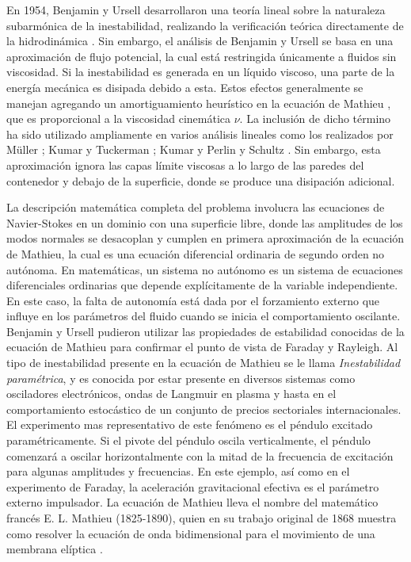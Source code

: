 En 1954, Benjamin y Ursell desarrollaron una teoría lineal sobre la naturaleza subarmónica de la inestabilidad, realizando la verificación teórica directamente de la hidrodinámica \cite{Benjamin1954}. Sin embargo, el análisis de Benjamin y Ursell se basa en una aproximación de flujo potencial, la cual está restringida únicamente a fluidos sin viscosidad. Si la inestabilidad es generada en un líquido viscoso, una parte de la energía mecánica es disipada debido a esta. Estos efectos generalmente se manejan agregando un amortiguamiento heurístico en la ecuación de Mathieu \cite{Landau1988}, que es proporcional a la viscosidad cinemática $\nu$. La inclusión de dicho término ha sido utilizado ampliamente en varios análisis lineales como los realizados por Müller \cite{Muller1993}; Kumar y Tuckerman \cite{Kumar1994}; Kumar \cite{Kumar1996} y Perlin y Schultz \cite{Perlin2000}. Sin embargo, esta aproximación ignora las capas límite viscosas a lo largo de las paredes del contenedor y debajo de la superficie, donde se produce una disipación adicional. \medskip

La descripción matemática completa del problema involucra las ecuaciones de Navier-Stokes en un dominio con una superficie libre, donde las amplitudes de los modos normales se desacoplan y cumplen en primera aproximación de la ecuación de Mathieu, la cual es una ecuación diferencial ordinaria de segundo orden no autónoma. En matemáticas, un sistema no autónomo es un sistema de ecuaciones diferenciales ordinarias que depende explícitamente de la variable independiente. En este caso, la falta de autonomía está dada por el forzamiento externo que influye en los parámetros del fluido cuando se inicia el comportamiento oscilante. Benjamin y Ursell pudieron utilizar las propiedades de estabilidad conocidas de la ecuación de Mathieu para confirmar el punto de vista de Faraday y Rayleigh. Al tipo de inestabilidad presente en la ecuación de Mathieu se le llama \textit{Inestabilidad paramétrica}, y es conocida por estar presente en diversos sistemas como osciladores electrónicos, ondas de Langmuir en plasma y hasta en el comportamiento estocástico de un conjunto de precios sectoriales internacionales. El experimento mas representativo de este fenómeno es el péndulo excitado paramétricamente. Si el pivote del péndulo oscila verticalmente, el péndulo comenzará a oscilar horizontalmente con la mitad de la frecuencia de excitación para algunas amplitudes y frecuencias. En este ejemplo, así como en el experimento de Faraday, la aceleración gravitacional efectiva es el parámetro externo impulsador. La ecuación de Mathieu lleva el nombre del matemático francés E. L. Mathieu (1825-1890), quien en su trabajo original de 1868 muestra como resolver la ecuación de onda bidimensional para el movimiento de una membrana elíptica \cite{Mathieu1868}.\medskip

